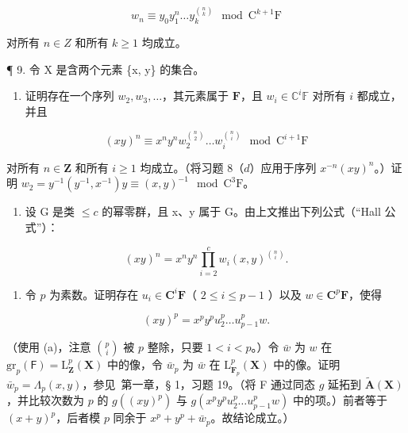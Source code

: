 \[
w _ {n} \equiv y _ {0} y _ {1} ^ {n} \dots y _ {k} ^ {\binom {n} {k}} \mod \mathrm{C} ^ {k + 1} \mathrm{F}
\]

对所有 \(n \in Z\) 和所有 \(k \geqslant 1\) 均成立。

¶ 9. 令 X 是含两个元素 \{x, y\} 的集合。

\begin{enumerate}
\def\labelenumi{(\alph{enumi})}
\tightlist
\item
  证明存在一个序列 \(w_{2}, w_{3}, \ldots\)，其元素属于 \(\mathbf{F}\)，且 \(w_{i} \in \mathbb{C}^{i}\mathbb{F}\) 对所有 \(i\) 都成立，并且
\end{enumerate}

\[
(x y) ^ {n} \equiv x ^ {n} y ^ {n} w _ {2} ^ {\binom {n} {2}} \dots w _ {i} ^ {\binom {n} {i}} \mod \mathrm{C} ^ {i + 1} \mathrm{F}
\]

对所有 \(n \in \mathbf{Z}\) 和所有 \(i \geqslant 1\) 均成立。（将习题 8（\(d\)）应用于序列 \(x^{-n}(xy)^n\)。）证明 \(w_2 = y^{-1}(y^{-1}, x^{-1})y \equiv (x, y)^{-1} \mod \mathrm{C}^3\mathrm{F}\)。

\begin{enumerate}
\def\labelenumi{(\alph{enumi})}
\setcounter{enumi}{1}
\tightlist
\item
  设 G 是类 \(\leqslant c\) 的幂零群，且 x、y 属于 G。由上文推出下列公式（“Hall 公式”）：
\end{enumerate}

\[
(x y) ^ {n} = x ^ {n} y ^ {n} \prod_ {i = 2} ^ {c} w _ {i} (x, y) ^ {\binom {n} {i}}.
\]

\begin{enumerate}
\def\labelenumi{(\alph{enumi})}
\setcounter{enumi}{2}
\tightlist
\item
  令 \(p\) 为素数。证明存在 \(u_{i} \in \mathbf{C}^{i}\mathbf{F}\)（ \(2 \leqslant i \leqslant p - 1\) ）以及 \(w \in \mathbf{C}^{p}\mathbf{F}\)，使得
\end{enumerate}

\[
(x y) ^ {p} = x ^ {p} y ^ {p} u _ {2} ^ {p} \dots u _ {p - 1} ^ {p} w.
\]

（使用 (a)，注意 \(\binom{p}{i}\) 被 \(p\) 整除，只要 \(1 < i < p\)。）令 \(\bar{w}\) 为 \(w\) 在 \(\mathrm{gr}_p(\mathsf{F}) = \mathrm{L}_{\mathbf{Z}}^p (\mathbf{X})\) 中的像，令 \(\bar{w}_p\) 为 \(\bar{w}\) 在 \(\mathrm{L}_{\mathbf{F}_p}^p (\mathbf{X})\) 中的像。证明 \(\bar{w}_p = \Lambda_p(x,y)\)，参见~第一章，§ 1，习题 19。（将 F 通过同态 \(g\) 延拓到 \(\tilde{\mathbf{A}}(\mathbf{X})\)，并比较次数为 \(p\) 的 \(g((xy)^p)\) 与 \(g(x^p y^p u_2^p \ldots u_{p-1}^p w)\) 中的项。）前者等于 \((x + y)^p\)，后者模 \(p\) 同余于 \(x^p + y^p + \bar{w}_p\)。故结论成立。）

